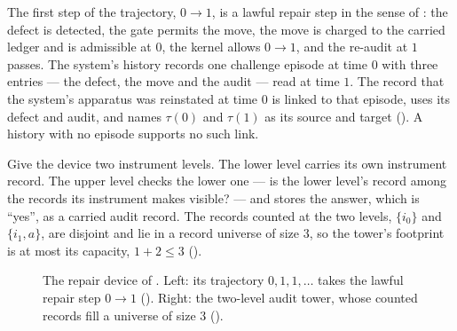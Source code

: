 The first step of the trajectory, $0 \to 1$, is a lawful repair step in the sense of
: the defect is detected, the gate permits the move, the move is charged to the
carried ledger and is admissible at $0$, the kernel allows $0 \to 1$, and the re-audit at $1$ passes.
The system's history records one challenge episode at time $0$ with three entries --- the defect,
the move and the audit --- read at time $1$. The record that the system's apparatus was reinstated
at time $0$ is linked to that episode, uses its defect and audit, and names $\tau(0)$ and $\tau(1)$
as its source and target (). A history with no episode supports no such link.

Give the device two instrument levels. The lower level carries its own instrument record. The upper
level checks the lower one --- is the lower level's record among the records its instrument makes
visible? --- and stores the answer, which is ``yes'', as a carried audit record. The records counted
at the two levels, $\{i_0\}$ and $\{i_1, a\}$, are disjoint and lie in a record universe of size
$3$, so the tower's footprint is at most its capacity, $1 + 2 \le 3$ ().

\begin{figure}[t]
\centering
{}
\caption{The repair device of . Left: its trajectory $0, 1, 1, \dots$ takes the
lawful repair step $0 \to 1$ (). Right: the two-level audit tower, whose counted
records fill a universe of size $3$ ().}\label{fig:device}
\end{figure}


